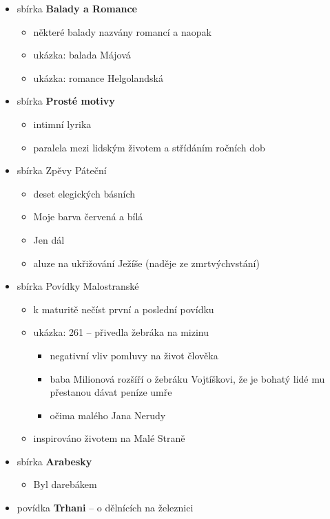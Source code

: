 \begin{itemize}
\begin{itemize}
	\end{itemize}
\item sbírka \textbf{Balady a Romance}
	\begin{itemize}
	\item některé balady nazvány romancí a naopak
	\item ukázka: balada Májová
	\item ukázka: romance Helgolandská
	\end{itemize}
\item sbírka \textbf{Prosté motivy}
	\begin{itemize}
	\item intimní lyrika
	\item paralela mezi lidským životem a střídáním ročních dob
	\end{itemize}
\item sbírka Zpěvy Páteční
	\begin{itemize}
	\item deset elegických básních
	\item Moje barva červená a bílá
	\item Jen dál
	\item aluze na ukřižování Ježíše (naděje ze zmrtvýchvstání)
	\end{itemize}
\item sbírka Povídky Malostranské
	\begin{itemize}
	\item k maturitě nečíst první a poslední povídku
	\item ukázka: 261 -- přivedla žebráka na mizinu
		\begin{itemize}
		\item negativní vliv pomluvy na život člověka
		\item baba Milionová rozšíří o žebráku Vojtíškovi, že je bohatý \ra lidé mu přestanou dávat peníze \ra  umře
		\item očima malého Jana Nerudy
		\end{itemize}
	\item inspirováno životem na Malé Straně
	\end{itemize}
\item sbírka \textbf{Arabesky}
	\begin{itemize}
	\item Byl darebákem
	\end{itemize}
\item povídka \textbf{Trhani} -- o dělnících na železnici
\end{itemize}

